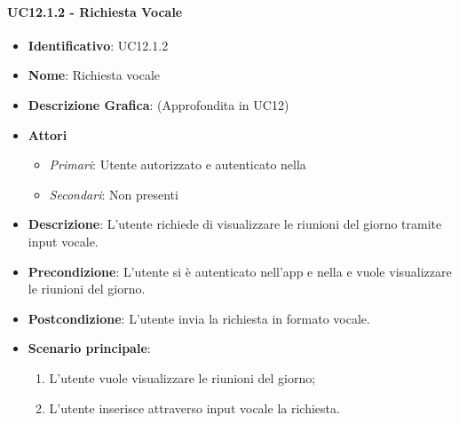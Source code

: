 \paragraph{UC12.1.2 - Richiesta Vocale }
\begin{itemize}
	\item \textbf{Identificativo}: UC12.1.2
	\item \textbf{Nome}: Richiesta vocale
	\item\textbf{Descrizione Grafica}: (Approfondita in UC12)
	\item \textbf{Attori}
	\begin{itemize} 
		\item \textit{Primari}: Utente autorizzato e autenticato nella 
		\item \textit{Secondari}: Non presenti
	\end{itemize}
	\item \textbf{Descrizione}: L'utente richiede di visualizzare le riunioni del giorno tramite input vocale.
	\item \textbf{Precondizione}: L'utente si è autenticato nell'app e nella  e vuole visualizzare le riunioni del giorno.
	\item \textbf{Postcondizione}: L'utente invia la richiesta in formato vocale.
	\item \textbf{Scenario principale}:
	\begin{enumerate}
		\item L'utente vuole visualizzare le riunioni del giorno;
		\item L'utente inserisce attraverso input vocale la richiesta.
	\end{enumerate}
\end{itemize}

